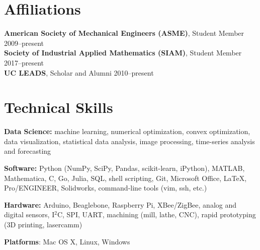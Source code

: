 \documentclass[]{res}
\begin{document}
\begin{resume}
\section{Affiliations}
\vspace{0.1in}

\textbf{American Society of Mechanical Engineers (ASME)}, Student Member \hfill 2009--present \\
\textbf{Society of Industrial Applied Mathematics (SIAM)}, Student Member \hfill 2017--present \\
\textbf{UC LEADS}, Scholar and Alumni \hfill 2010--present


\section{Technical Skills}
\vspace{0.1in}

\textbf{Data Science:} machine learning, numerical optimization, convex
optimization, data visualization, statistical data analysis, image processing,
time-series analysis and forecasting

\textbf{Software:} Python (NumPy, SciPy, Pandas, scikit-learn, iPython),
MATLAB, Mathematica, C, Go, Julia, SQL, shell scripting, Git, Microsoft Office,
LaTeX, Pro/ENGINEER, Solidworks, command-line tools (vim, ssh, etc.)

\textbf{Hardware:} Arduino, Beaglebone, Raspberry Pi, XBee/ZigBee, analog and
digital sensors, I$^2$C, SPI, UART, machining (mill, lathe, CNC), rapid
prototyping (3D printing, lasercamm)

\textbf{Platforms}: Mac OS X, Linux, Windows

\end{resume}
\end{document}
